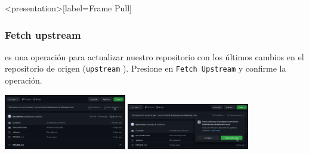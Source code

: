 \begin{frame}<presentation>[label=Frame Pull]
  \frametitle{Fetch upstream}

  es una operación para actualizar nuestro repositorio con los últimos cambios en el repositorio de origen (\texttt{upstream} ). 
  Presione en \texttt{Fetch Upstream} y confirme la operación.

  \includegraphics[width=0.4\textwidth]{Screenshots/FetchUpstream.png}
  \quad
  \includegraphics[width=0.4\textwidth]{Screenshots/FetchAndMerge.png}

\end{frame}
